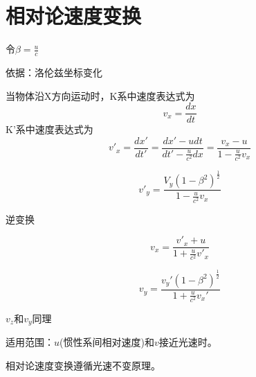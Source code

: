 
	
	
\section{相对论速度变换}
	
\begin{theorem}[相对论速度变换公式]


令$\beta= \frac{u}{c}$

依据：洛伦兹坐标变化

当物体沿X方向运动时，K系中速度表达式为
$$v_x = \frac{dx}{dt}	$$
K'系中速度表达式为
$$v'_x = \frac{dx'}{dt'} =  \frac{dx'-udt}{dt'-\frac{u}{c^2}dx} =\frac{v_x-u}{1-\frac{u}{c^2} v_x}	$$

$$v'_y =\frac{V_y(1-\beta^2)^\frac{1}{2}}{1-\frac{u}{c^2}v_x}	$$


逆变换

$$ v_x = \frac{v'_x + u} {1 + \frac{u} {c^2}v'_x } $$

$$v_y =\frac{v_y'(1-\beta^2)^\frac{1}{2}}{1+\frac{u}{c^2}v_x'}	$$

$v_z$和$v_y$同理
\end{theorem}

\begin{note}
	适用范围：$u$(惯性系间相对速度)和$v$接近光速时。
	
	相对论速度变换遵循光速不变原理。
\end{note}


